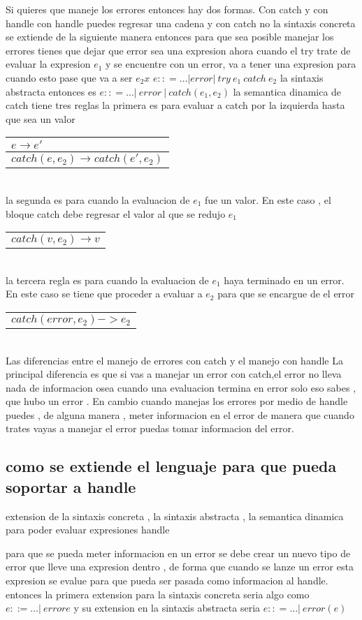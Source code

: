 \documentclass[12p]{article}
\makeatletter
\newcommand{\logicarg}[2]{
  \begin{tabular}[t]{@{}l@{}}
    #1 \\ \hline #2 
  \end{tabular}
}
\makeatother
\begin{document}
Si quieres que maneje los errores entonces hay dos formas. Con catch y con handle 
con handle puedes regresar una cadena y con catch no 
la sintaxis concreta se extiende de la siguiente manera 
entonces para que sea posible manejar los errores tienes que dejar que error sea una expresion 
ahora cuando el try trate de evaluar la expresion $ e_ 1$ y se encuentre con un error, va a tener una 
expresion para cuando esto pase que va a ser $e _2 x$ 
$e :: = \dots | error | \ try \ e _ 1 \ catch \ e_2$
la sintaxis abstracta entonces es 
$e :: = \dots | \ error \ | \ catch(e_1 , e_2 ) $
la semantica dinamica de catch tiene tres reglas 
la primera es para evaluar a catch por la izquierda hasta que sea un valor \\ 
\logicarg{$e \rightarrow e'$}{$catch(e,e_2) \rightarrow catch(e',e_2)$} \\
la segunda es para cuando la evaluacion de $e _ 1 $ fue un valor. En este caso , el bloque catch debe 
regresar el valor al que se redujo $e _ 1$ \\ 
\logicarg{}{$catch(v,e_2) \rightarrow v $} \\ 
la tercera regla es para cuando la evaluacion de $e_ 1 $ haya terminado en un error. En este caso se tiene
que proceder a evaluar a $e _2 $ para que se encargue de el error \\ 
\logicarg{}{$catch(error,e_2) -> e_2$} \\ 

Las diferencias entre el manejo de errores con catch y el manejo con handle 
La principal diferencia es que si vas a manejar un error con catch,el error no lleva nada de informacion 
osea cuando una evaluacion termina en error solo eso sabes , que hubo un error . En cambio cuando manejas 
los errores por medio de handle puedes , de alguna manera , meter informacion en el error de manera que 
cuando trates vayas a manejar el error puedas tomar informacion del error. 

\subsection{como se extiende el lenguaje para que pueda soportar a handle}
extension de la sintaxis concreta , la sintaxis abstracta , la semantica dinamica para 
poder evaluar expresiones handle

para que se pueda meter informacion en un error se debe crear un nuevo tipo de error que lleve una expresion 
dentro , de forma que cuando se lanze un error esta expresion se evalue para que pueda ser pasada como 
informacion al handle.
entonces la primera extension para la sintaxis concreta seria algo como 
$e ::= \dots | \ error e  $ y su extension en la sintaxis abstracta seria 
$e :: = \dots | \ error(e)$ 
\end{document}
